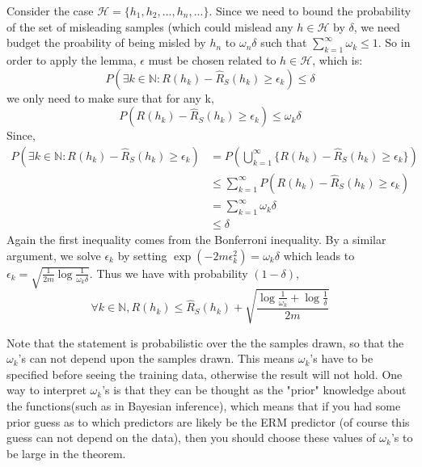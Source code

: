 \begin{corollary}
	Consider the case $\mathcal{H}=\{h_1,h_2,...,h_n,...\}$. Since we
	need to bound the probability of the set of misleading samples (which could mislead any $h\in \mathcal{H}$ by $\delta$, we
	need budget the proability of being misled by $h_n$ to $\omega_n\delta$ such that $\sum_{k=1}^{\infty} \omega_k \leq 1$. So in order to apply the lemma, $\epsilon$ must be chosen related to $h \in \mathcal{H}$, which is: 
	\begin{equation}
	P\left( \exists k \in \mathbb{N}: R(h_k)- \hat{R}_S (h_k) \geq \epsilon_k \right) \leq \delta
	\end{equation}
	we only need to make sure that for any k,
	\begin{equation}
	P\left( R(h_k)- \hat{R}_S (h_k) \geq \epsilon_k \right) \leq \omega_k\delta
	\end{equation}
	Since,
	\begin{align}
	P\left( \exists k \in \mathbb{N}: R(h_k)- \hat{R}_S (h_k) \geq \epsilon_k \right) &= P\left( \bigcup_{k=1}^{\infty} \{R(h_k)- \hat{R}_S (h_k) \geq \epsilon_k \} \right) \\
	&\leq \sum_{k=1}^{\infty} P\left( R(h_k)- \hat{R}_S (h_k) \geq \epsilon_k \right) \\
	&= \sum_{k=1}^{\infty} \omega_k\delta \\
	&\leq \delta
	\end{align}
	Again the first inequality comes from the Bonferroni inequality. By a similar argument, we solve $\epsilon_k$ by setting
	$\exp(-2m\epsilon_k^2)= \omega_k\delta$ which leads to $\epsilon_k = \sqrt{\frac{1}{2m} \log\frac{1}{\omega_k\delta}}$. Thus we have with probability $(1-\delta)$,
	\begin{equation}
	\forall k \in \mathbb{N}, R(h_k) \leq \hat{R}_S(h_k)+ \sqrt{\frac{\log \frac{1}{\omega_k}+ \log \frac{1}{\delta}}{2m}} 
	\end{equation}
\end{corollary}

Note that the statement is probabilistic over the the samples drawn, so that the $\omega_k$'s can not depend upon the samples drawn. This means $\omega_k$'s have to be specified before seeing the training data, otherwise the result will not hold. One
way to interpret $\omega_k$'s is that they can be thought as the "prior" knowledge about the functions(such as in Bayesian inference), which means that if you had some prior guess as to which predictors are likely be the ERM predictor (of course this guess can not depend on the data), then you should choose these values of $\omega_k$'s to be large in the theorem.\\

